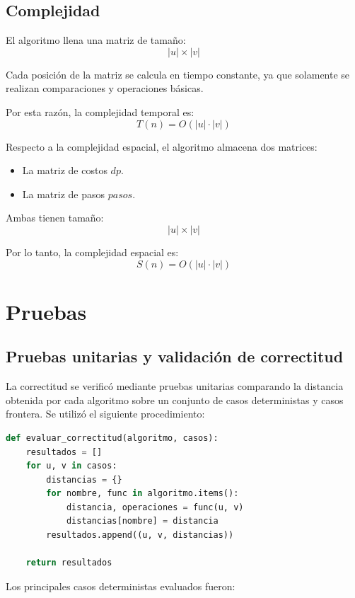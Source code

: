 \documentclass[12pt]{article}
\begin{document}
\subsection*{Complejidad}

El algoritmo llena una matriz de tamaño:
$$|u| \times |v|$$

Cada posición de la matriz se calcula en tiempo constante, ya que solamente se realizan comparaciones y operaciones básicas.

Por esta razón, la complejidad temporal es:
$$T(n)=O(|u|\cdot|v|)$$

Respecto a la complejidad espacial, el algoritmo almacena dos matrices:

\begin{itemize}
    \item La matriz de costos \(dp\).
    \item La matriz de pasos \(pasos\).
\end{itemize}

Ambas tienen tamaño:
$$|u| \times |v|$$

Por lo tanto, la complejidad espacial es:
$$S(n)=O(|u|\cdot|v|)$$


\section{Pruebas}

\subsection*{Pruebas unitarias y validación de correctitud}

La correctitud se verificó mediante pruebas unitarias comparando la distancia obtenida por cada algoritmo sobre un conjunto de casos deterministas y casos frontera. Se utilizó el siguiente procedimiento:

\begin{lstlisting}[language=Python]
def evaluar_correctitud(algoritmo, casos):
    resultados = []
    for u, v in casos:
        distancias = {}
        for nombre, func in algoritmo.items():
            distancia, operaciones = func(u, v)
            distancias[nombre] = distancia
        resultados.append((u, v, distancias))

    return resultados
\end{lstlisting}

Los principales casos deterministas evaluados fueron:
\end{document}
